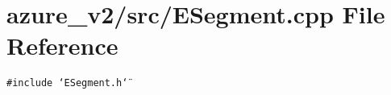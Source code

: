 \section{azure\_\-v2/src/ESegment.cpp File Reference}
\label{ESegment_8cpp}
{\tt \#include \char`\"{}ESegment.h\char`\"{}}\par
